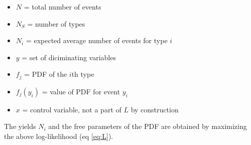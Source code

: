 \documentclass[english]{uzhpub}
\begin{document}
 \begin{itemize}
  \item $N$ = total number of events \\
  \item $N_S$ = number of types \\
  \item $N_i$ = expected average number of events for type $i$ \\
  \item $y$ = set of diciminating variables \\
  \item $f_j$ = PDF of the $i$th type \\
  \item $f_j(y_i)$ = value of PDF for event $y_i$ \\
  \item $x$ = control variable, not a part of $L$ by construction
 \end{itemize}
 The yields $N_i$ and the free parameters of the PDF are obtained by maximizing the above log-likelihood (eq \ref{eq:L}).
\end{document}
